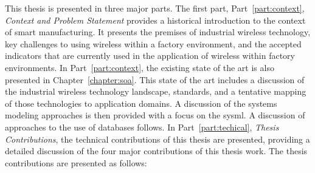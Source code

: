 This thesis is presented in three major parts.  The first part, Part~\ref{part:context}, \textit{Context and Problem Statement} provides a historical introduction to the context of smart manufacturing.  It presents the premises of industrial wireless technology, key challenges to using wireless within a factory environment, and the accepted indicators that are currently used in the application of wireless within factory environments. In Part~\ref{part:context}, the existing state of the art is also presented in Chapter~\ref{chapter:soa}.  This state of the art includes a discussion of the industrial wireless technology landscape, standards, and a tentative mapping of those technologies to application domains.  A discussion of the systems modeling approaches is then provided with a focus on the \gls{sysml}.  A discussion of approaches to the use of databases follows.  In Part~\ref{part:techical}, \textit{Thesis Contributions}, the technical contributions of this thesis are presented, providing a detailed discussion of the four major contributions of this thesis work.  The thesis contributions are presented as follows:

%	
%	
%	

